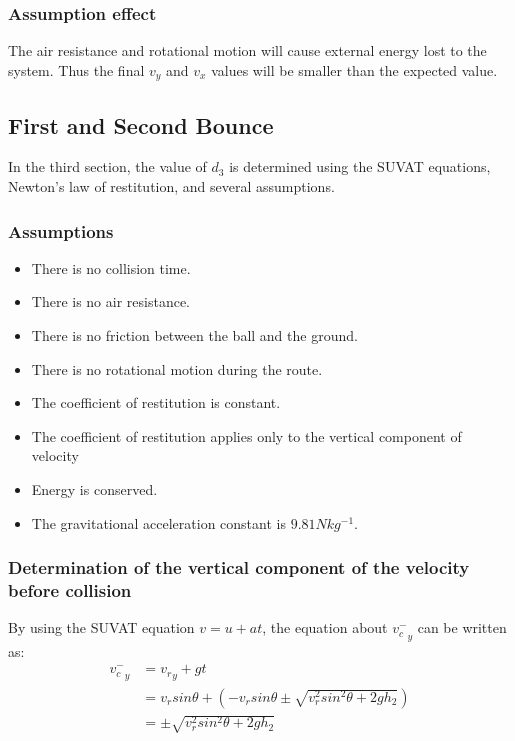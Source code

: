 \documentclass[conference]{IEEEtran}
\begin{document}
        \subsubsection{Assumption effect}
        The air resistance and rotational motion will cause external energy lost to the system. Thus the final $v_y$ and $v_x$ values will be smaller than the expected value.
    \subsection{First and Second Bounce}
        In the third section, the value of $d_3$ is determined using the SUVAT equations, Newton's law of restitution, and several assumptions.
        \subsubsection{Assumptions}
            \begin{itemize}
                \item There is no collision time.
                \item There is no air resistance.
                \item There is no friction between the ball and the ground.
                \item There is no rotational motion during the route.
                \item The coefficient of restitution is constant.
                \item The coefficient of restitution applies only to the vertical component of velocity
                \item Energy is conserved.
                \item The gravitational acceleration constant is $9.81Nkg^{-1}$.
            \end{itemize}
        \subsubsection{Determination of the vertical component of the velocity before collision}
            By using the SUVAT equation $v = u + at$, the equation about ${v^-_c}_y$ can be written as:
            \begin{equation}
                \begin{aligned}
                    {v^-_c}_y &= {v_r}_y + gt\\
                    &= v_rsin\theta + (-v_{r}sin\theta\pm\sqrt{{v^2_{r}sin^2\theta}+2gh_2}) \\
                    &= \pm\sqrt{{v^2_{r}sin^2\theta}+2gh_2}
                \end{aligned}
            \end{equation}
\end{document}
